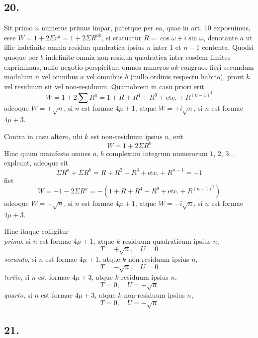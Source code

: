 \documentclass[twoside,12pt]{memoir}
\begin{document}
\subsection*{20.}
 
Sit primo \(n\) numerus primus impar, patetque per ea, quae in art. 10 exposuimus, esse \(W=1+2 \Sigma r^{a}=1+2 \Sigma R^{a k}\), si statuatur \(R=\cos \omega+i \sin \omega\), denotante \(a\) ut illic indefinite omnia residua quadratica ipsius \(n\) inter 1 et \(n-1\) contenta. Quodsi quoque per \(b\) indefinite omnia non-residua quadratica inter eosdem limites exprimimus, nullo negotio perspicitur, omnes numeros \(a k\) congruos fieri secundum modulum \(n\) vel omnibus \(a\) vel omnibus \(b\) (nullo ordinis respectu habito), prout \(k\) vel residuum sit vel non-residuum. Quamobrem in casu priori erit\pagebreak%
\[W=1+2 \sum R^{a}=1+R+R^{4}+R^{9}+\text{etc.}+R^{(n-1)^{2}}\]
adeoque \(W=+\surd n\), si \(n\) est formae \(4 \mu+1\), atque \(W=+i \surd n\), si \(n\) est formae \(4 \mu+3\).

Contra in casu altero, ubi \(k\) est non-residuum ipsius \(n\), erit
\[W=1+2 \Sigma R^{b}\]
Hinc quum manifesto omnes \(a\), \(b\) complexum integrum numerorum \(1\), \(2\), \(3 \ldots\) expleant, adeoque sit
\[\Sigma R^{a}+\Sigma R^{b}=R+R^{2}+R^{3}+\text{etc.}+R^{n-1}=-1\]
fiet
\[W=-1-2 \Sigma R^{a}=-(1+R+R^{4}+R^{9}+\text{etc.}+R^{(n-1)^{2}})\]
adeoque \(W=-\surd n\), si \(n\) est formae \(4 \mu+1\), atque \(W=-i \surd n\), si \(n\) est formae \(4 \mu+3\).

Hinc itaque colligitur\\
\textit{primo}, si \(n\) est formae \(4 \mu+1\), atque \(k\) residuum quadraticum ipsius \(n\),
\[T=+\surd n, \quad U=0\]
\textit{secundo}, si \(n\) est formae \(4 \mu+1\), atque \(k\) non-residuum ipsius \(n\),
\[T=-\surd n, \quad U=0\]
\textit{tertio}, si \(n\) est formae \(4 \mu+3\), atque \(k\) residuum ipsius \(n\),
\[T=0, \quad U=+\surd n\]
\textit{quarto}, si \(n\) est formae \(4 \mu+3\), atque \(k\) non-residuum ipsius \(n\),
\[T=0, \quad U=-\surd n\]

\subsection*{21.}
 
\end{document}
